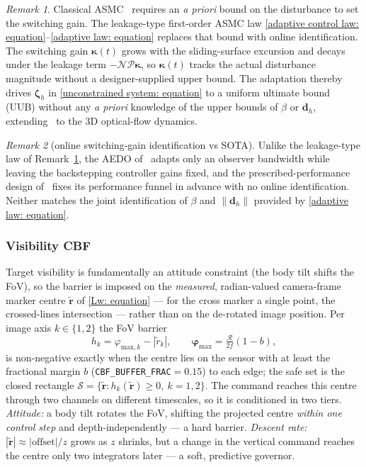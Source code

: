\documentclass{IEEEtaes}
\theoremstyle{definition}
\theoremstyle{remark}
\newtheorem{remark}{Remark}
\begin{document}
\begin{remark}\label{rem:leakage} Classical ASMC~\cite{roy2020} requires an \emph{a priori} bound on the disturbance to set the switching gain. The leakage-type first-order ASMC law \eqref{adaptive control law: equation}--\eqref{adaptive law: equation} replaces that bound with online identification. The switching gain $\boldsymbol{\kappa}(t)$ grows with the sliding-surface excursion and decays under the leakage term $-\mathcal{N}\mathcal{P}\boldsymbol{\kappa}$, so $\boldsymbol{\kappa}(t)$ tracks the actual disturbance magnitude without a designer-supplied upper bound. The adaptation thereby drives $\boldsymbol{\zeta}_h$ in \eqref{unconstrained system: equation} to a uniform ultimate bound (UUB) without any \emph{a priori} knowledge of the upper bounds of $\beta$ or $\boldsymbol{d}_h$, extending~\cite{singhal2025} to the 3D optical-flow dynamics.\end{remark}

\begin{remark}[online switching-gain identification vs SOTA]\label{rem:adapt-sota} Unlike the leakage-type law of Remark~\ref{rem:leakage}, the AEDO of~\cite{zhang2026} adapts only an observer bandwidth while leaving the backstepping controller gains fixed, and the prescribed-performance design of~\cite{lin2023} fixes its performance funnel in advance with no online identification. Neither matches the joint identification of $\beta$ and $\|\boldsymbol{d}_h\|$ provided by \eqref{adaptive law: equation}.\end{remark}

\subsubsection{Visibility CBF} \label{acceleration conditioning: section}
Target visibility is fundamentally an attitude constraint (the body tilt shifts the FoV), so the barrier is imposed on the \emph{measured}, radian-valued camera-frame marker centre $\tilde{\boldsymbol{r}}$ of \eqref{Lw: equation} --- for the cross marker a single point, the crossed-lines intersection --- rather than on the de-rotated image position. Per image axis $k\in\{1,2\}$ the FoV barrier
\begin{equation} \label{cbf barrier: equation}
    h_{k} = \varphi_{\text{max},k} - |\tilde{r}_{k}|,\qquad \boldsymbol{\varphi}_\text{max}=\tfrac{\mathcal{R}}{2f}(1-b),
\end{equation}
is non-negative exactly when the centre lies on the sensor with at least the fractional margin $b$ (\texttt{CBF\_BUFFER\_FRAC}$=0.15$) to each edge; the safe set is the closed rectangle $\mathcal{S}=\{\tilde{\boldsymbol{r}}:h_k(\tilde{\boldsymbol{r}})\ge0,\ k=1,2\}$. The command reaches this centre through two channels on different timescales, so it is conditioned in two tiers. \emph{Attitude:} a body tilt rotates the FoV, shifting the projected centre \emph{within one control step} and depth-independently --- a hard barrier. \emph{Descent rate:} $|\tilde{\boldsymbol{r}}|\approx|\text{offset}|/z$ grows as $z$ shrinks, but a change in the vertical command reaches the centre only two integrators later --- a soft, predictive governor.
\end{document}
